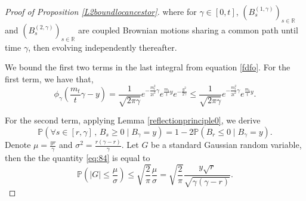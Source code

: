 \documentclass{article}
\newcommand{\Prob}{\mathbb{P}}
\begin{document}
\begin{proof}[Proof of Proposition \ref{L2boundlocancestor}]
where for $\gamma \in \left[0,t\right]$, $(B^{(1,\gamma)}_s)_{s\in \mathbb{R}}$ and $(B^{(2,\gamma)}_s)_{s\in \mathbb{R}}$ are coupled Brownian motions sharing a common path until time $\gamma$, then evolving independently thereafter.


We bound the first two terms in the last integral from equation \eqref{fdfo}. For the first term, we have that,
\begin{equation}
    \phi_\gamma\left(\frac{m_t}{t}\gamma-y\right)= \frac{1}{\sqrt{2 \pi \gamma}}e^{-\frac{m_t^2}{2t^2}\gamma}e^{\frac{m_t}{t}y}e^{- \frac{y^2}{2\gamma}} \leq \frac{1}{\sqrt{2 \pi \gamma}}e^{-\frac{m_t^2}{2t^2}\gamma}e^{\frac{m_t}{t}y}.
\end{equation}

For the second term, applying Lemma \ref{reflectionprinciple0}, we derive
\begin{equation} \label{eq:84}
    \Prob\left(\forall s \in [r, \gamma] \, , \, B_s \geq 0 \mid B_\gamma = y \right)= 1- 2\Prob(B_r \leq 0 \mid B_\gamma = y ).
\end{equation}
Denote $\mu = \frac{y r}{\gamma}$ and $\sigma^2= \frac{r(\gamma - r)}{\gamma}$. Let $G$ be a standard Gaussian random variable, then the the quantity \eqref{eq:84} is equal to
\begin{equation}
    \Prob\left( |G| \leq \frac{\mu}{\sigma}\right) \leq \sqrt{\frac{2}{ \pi}} \frac{\mu}{\sigma}=\sqrt{\frac{2}{ \pi}} \frac{y \sqrt{r}}{\sqrt{\gamma(\gamma - r)}}.
\end{equation}


\end{proof}
\end{document}
